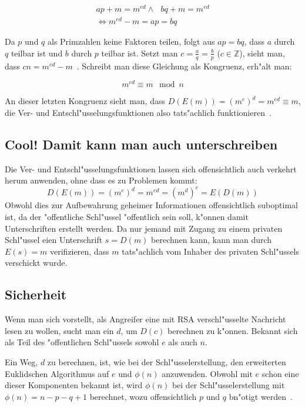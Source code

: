 \documentclass[12pt]{article}
\begin{document}
\[
\begin{aligned}
ap + m = m^{ed} \land ~~~ bq + m = m^{ed} \\
\iff m^{ed} - m = ap = bq
\end{aligned}
\]

Da $p$ und $q$ als Primzahlen keine Faktoren teilen, folgt aus $ap = bq$,
dass $a$ durch $q$ teilbar ist und $b$ durch $p$ teilbar ist.
Setzt man $c = \frac{a}{q} = \frac{b}{p}$ ($c \in \mathbb{Z}$),
sieht man, dass $cn = m^{ed} - m$~\cite{pii1}.
Schreibt man diese Gleichung als Kongruenz, erh"alt man:

\[
m^{ed} \equiv m \mod n
\]

An dieser letzten Kongruenz sieht man, dass $D(E(m)) = (m^e)^d = m^{ed} \equiv m$,
die Ver- und Entschl"usselungsfunktionen also tats"achlich funktionieren~\cite{rsa}.

\subsection{Cool! Damit kann man auch unterschreiben}

Die Ver- und Entschl"usselungsfunktionen lassen sich offensichtlich
auch verkehrt herum anwenden, ohne dass es zu Problemen kommt:
\[D(E(m)) = (m^e)^d = m^{ed} = (m^d)^e = E(D(m))\]
Obwohl dies zur Aufbewahrung geheimer Informationen offensichtlich suboptimal ist,
da der "offentliche Schl"ussel "offentlich sein soll, k"onnen damit Unterschriften erstellt werden.
Da nur jemand mit Zugang zu einem privaten Schl"ussel eien Unterschrift $s = D(m)$ berechnen kann,
kann man durch $E(s) = m$ verifizieren, dass $m$ tats"achlich vom
Inhaber des privaten Schl"ussels verschickt wurde.

\subsection{Sicherheit}

Wenn man sich vorstellt, als Angreifer eine mit RSA verschl"usselte Nachricht
lesen zu wollen, sucht man ein $d$, um $D(c)$ berechnen zu k"onnen.
Bekannt sich als Teil des "offentlichen Schl"ussels sowohl $e$ als auch $n$.

Ein Weg, $d$ zu berechnen, ist, wie bei der Schl"usselerstellung,
den erweiterten Euklidschen Algorithmus auf $e$ und $\phi(n)$ anzuwenden.
Obwohl mit $e$ schon eine dieser Komponenten bekannt ist, wird $\phi(n)$
bei der Schl"usselerstellung mit $\phi(n) = n - p - q + 1$ berechnet,
wozu offensichtlich $p$ und $q$ bn"otigt werden~\cite{rsa}.
\end{document}
